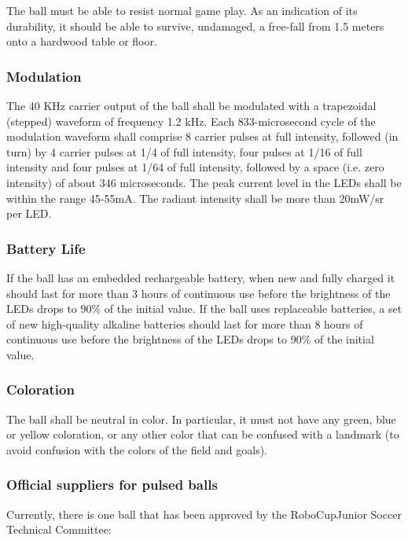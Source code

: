 \documentclass{article}
\begin{document}
The ball must be able to resist normal game play. As an indication of its durability, it should be able to survive, undamaged, a free-fall from 1.5 meters onto a hardwood table or floor.

\subsubsection{Modulation}

The 40 KHz carrier output of the ball shall be modulated with a trapezoidal (stepped) waveform of frequency 1.2 kHz. Each 833-microsecond cycle of the modulation waveform shall comprise 8 carrier pulses at full intensity, followed (in turn) by 4 carrier pulses at 1/4 of full intensity, four pulses at 1/16 of full intensity and four pulses at 1/64 of full intensity, followed by a space (i.e. zero intensity) of about 346 microseconds. The peak current level in the LEDs shall be within the range 45-55mA. The radiant intensity shall be more than 20mW/sr per LED.

\subsubsection{Battery Life}

If the ball has an embedded rechargeable battery, when new and fully charged it should last for more than 3 hours of continuous use before the brightness of the LEDs drops to 90\% of the initial value. If the ball uses replaceable batteries, a set of new high-quality alkaline batteries should last for more than 8 hours of continuous use before the brightness of the LEDs drops to 90\% of the initial value.

\subsubsection{Coloration}

The ball shall be neutral in color. In particular, it must not have any green, blue or yellow coloration, or any other color that can be confused with a landmark (to avoid confusion with the colors of the field and goals).

\subsubsection{Official suppliers for pulsed balls}

Currently, there is one ball that has been approved by the RoboCupJunior Soccer Technical Committee:
\end{document}
